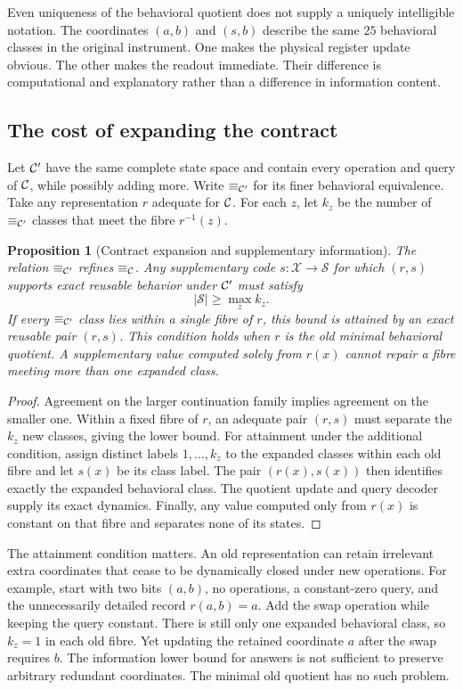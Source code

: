 \documentclass[11pt,letterpaper]{article}
\theoremstyle{plain}
\newtheorem{proposition}[theorem]{Proposition}
\theoremstyle{definition}
\newcommand{\X}{\mathcal X}\newcommand{\Z}{\mathcal Z}
\begin{document}
Even uniqueness of the behavioral quotient does not supply a uniquely intelligible notation. The coordinates $(a,b)$ and $(s,b)$ describe the same $25$ behavioral classes in the original instrument. One makes the physical register update obvious. The other makes the readout immediate. Their difference is computational and explanatory rather than a difference in information content.

\subsection{The cost of expanding the contract}
Let $\mathcal C'$ have the same complete state space and contain every operation and query of $\mathcal C$, while possibly adding more. Write $\equiv_{\mathcal C'}$ for its finer behavioral equivalence. Take any representation $r$ adequate for $\mathcal C$. For each $z$, let $k_z$ be the number of $\equiv_{\mathcal C'}$ classes that meet the fibre $r^{-1}(z)$.

\begin{proposition}[Contract expansion and supplementary information]\label{prop:expansion}
The relation $\equiv_{\mathcal C'}$ refines $\equiv_{\mathcal C}$. Any supplementary code $s:\X\to\mathcal S$ for which $(r,s)$ supports exact reusable behavior under $\mathcal C'$ must satisfy
\[
|\mathcal S|\geq\max_z k_z.
\]
If every $\equiv_{\mathcal C'}$ class lies within a single fibre of $r$, this bound is attained by an exact reusable pair $(r,s)$. This condition holds when $r$ is the old minimal behavioral quotient. A supplementary value computed solely from $r(x)$ cannot repair a fibre meeting more than one expanded class.
\end{proposition}
\begin{proof}
Agreement on the larger continuation family implies agreement on the smaller one. Within a fixed fibre of $r$, an adequate pair $(r,s)$ must separate the $k_z$ new classes, giving the lower bound. For attainment under the additional condition, assign distinct labels $1,\ldots,k_z$ to the expanded classes within each old fibre and let $s(x)$ be its class label. The pair $(r(x),s(x))$ then identifies exactly the expanded behavioral class. The quotient update and query decoder supply its exact dynamics. Finally, any value computed only from $r(x)$ is constant on that fibre and separates none of its states.
\end{proof}

The attainment condition matters. An old representation can retain irrelevant extra coordinates that cease to be dynamically closed under new operations. For example, start with two bits $(a,b)$, no operations, a constant-zero query, and the unnecessarily detailed record $r(a,b)=a$. Add the swap operation while keeping the query constant. There is still only one expanded behavioral class, so $k_z=1$ in each old fibre. Yet updating the retained coordinate $a$ after the swap requires $b$. The information lower bound for answers is not sufficient to preserve arbitrary redundant coordinates. The minimal old quotient has no such problem.
\end{document}
